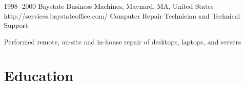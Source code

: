 \documentclass[10pt]{article} %
\begin{document}
\job
{1998 -}{2000}
{Baystate Business Machines, Maynard, MA, United States}
{http://services.baystateoffice.com/}
{Computer Repair Technician and Technical Support}
{\begin{itemize-noindent}
\item{Performed remote, on-site and in-house repair of desktops, laptops, and servers}
\end{itemize-noindent}}
\section{Education}
\end{document}
